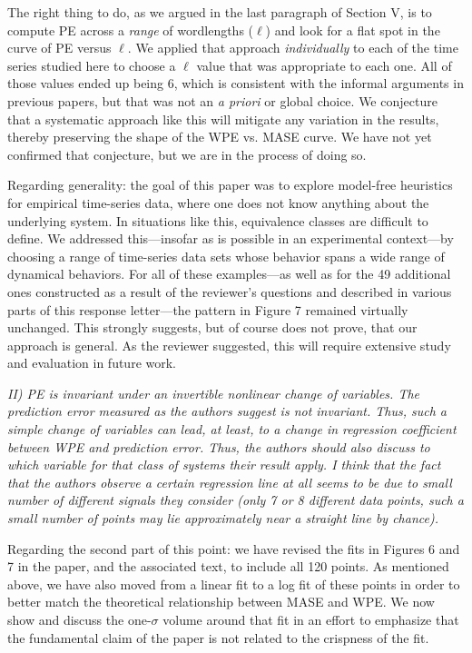 \documentclass[12pt]{article}
\begin{document}
The right thing to do, as we argued in the last paragraph of Section
V, is to compute PE across a \emph{range} of wordlengths ($\ell$) and
look for a flat spot in the curve of PE versus $\ell$.  We applied
that approach \emph{individually} to each of the time series studied
here to choose a $\ell$ value that was appropriate to each one.  All
of those values ended up being 6, which is consistent with the
informal arguments in previous papers, but that was not an \emph{a
  priori} or global choice.  We conjecture that a systematic approach
like this will mitigate any variation in the results, thereby
preserving the shape of the WPE vs. MASE curve.  We have not yet
confirmed that conjecture, but we are in the process of doing so.

Regarding generality: the goal of this paper was to explore model-free
heuristics for empirical time-series data, where one does not know
anything about the underlying system.  In situations like this,
equivalence classes are difficult to define.  We addressed
this---insofar as is possible in an experimental context---by choosing
a range of time-series data sets whose behavior spans a wide range of
dynamical behaviors.  For all of these examples---as well as for the
49 additional ones
constructed as a result of the reviewer's questions and described in
various parts of this response letter---the pattern in Figure 7
remained virtually unchanged.  This strongly suggests, but of course
does not prove, that our approach is general.  As the reviewer
suggested, this will require extensive study and evaluation in future
work.

\smallskip

\emph{II) PE is invariant under an invertible nonlinear change of
  variables. The prediction error measured as the authors suggest is
  not invariant. Thus, such a simple change of variables can lead, at
  least, to a change in regression coefficient between WPE and
  prediction error. Thus, the authors should also discuss to which
  variable for that class of systems their result apply. I think that
  the fact that the authors observe a certain regression line at all
  seems to be due to small number of different signals they consider
  (only 7 or 8 different data points, such a small number of points
  may lie approximately near a straight line by chance).}

Regarding the second part of this point: we have revised the fits in
Figures 6 and 7 in the paper, and the associated text, to include all
120 points.  As mentioned above, we have also moved from a linear fit
to a log fit of these points in order to better match the theoretical
relationship between MASE and WPE.  We now show and discuss the
one-$\sigma$ volume around that fit in an effort to emphasize that the
fundamental claim of the paper is not related to the crispness of the
fit.
\end{document}
